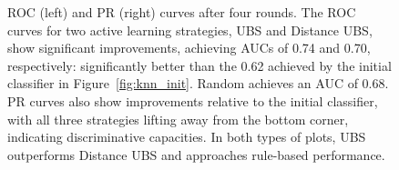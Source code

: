 \begin{figure}
\caption{ROC (left) and PR (right) curves after four rounds. 
The ROC curves for two active learning strategies, UBS and Distance UBS, show significant improvements,
achieving AUCs of 0.74 and 0.70, respectively: significantly better than the 0.62 achieved by the initial
classifier in Figure~\ref{fig:knn_init}. 
Random achieves an AUC of 0.68.
PR curves also show improvements relative to the initial classifier, with all three strategies
lifting away from the bottom corner, indicating discriminative capacities.
In both types of plots, UBS outperforms Distance UBS and approaches rule-based performance.
}\label{fig:rocs_prcs_round5}\label{fig:prcs_round5}
\end{figure}

